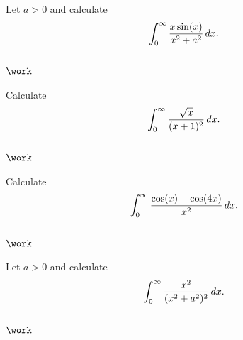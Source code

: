 \begin{problem}[?]

Let \(a>0\) and calculate
\begin{align*}
\int_0^\infty {x\sin(x) \over x^2 + a^2} \,dx
.\end{align*}

\end{problem}

\hypertarget{work-50}{%
\subsection{\texorpdfstring{\(\work\)}{\textbackslash work}}\label{work-50}}

\begin{problem}[?]

Calculate
\begin{align*}
\int_0^\infty {\sqrt x \over (x+1)^2} \,dx
.\end{align*}

\end{problem}

\hypertarget{work-51}{%
\subsection{\texorpdfstring{\(\work\)}{\textbackslash work}}\label{work-51}}

\begin{problem}[?]

Calculate
\begin{align*}
\int_0^\infty {\cos(x) - \cos(4x) \over x^2} \, dx
.\end{align*}

\end{problem}

\hypertarget{work-52}{%
\subsection{\texorpdfstring{\(\work\)}{\textbackslash work}}\label{work-52}}

\begin{problem}[?]

Let \(a>0\) and calculate
\begin{align*}
\int_0^\infty {x^2 \over (x^2 + a^2)^2} \, dx
.\end{align*}

\end{problem}

\hypertarget{work-53}{%
\subsection{\texorpdfstring{\(\work\)}{\textbackslash work}}\label{work-53}}

